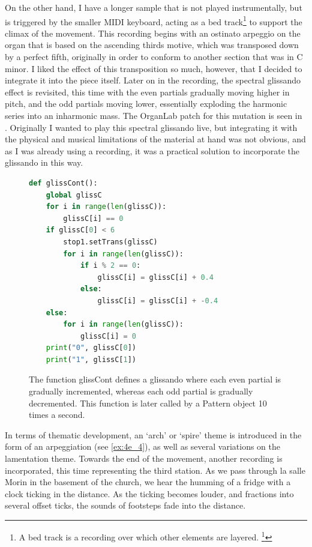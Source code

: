 \documentclass[12pt,twoside,maitrise]{dms_ks}
\theoremstyle{definition}
\begin{document}
{On the other hand, I have a longer sample that is not played instrumentally, but is triggered by the smaller MIDI keyboard, acting as a bed track\footnote{A bed track is a recording over which other elements are layered. \footcite{attariwala_re-imagining_2021}} to support the climax of the movement. 
This recording begins with an ostinato arpeggio on the organ that is based on the ascending thirds motive, which was transposed down by a perfect fifth, originally in order to conform to another section that was in C minor. 
I liked the effect of this transposition so much, however, that I decided to integrate it into the piece itself. 
Later on in the recording, the spectral glissando effect is revisited, this time with the even partials gradually moving higher in pitch, and the odd partials moving lower, essentially exploding the harmonic series into an inharmonic mass. 
The OrganLab patch for this mutation is seen in .
Originally I wanted to play this spectral glissando live, but integrating it with the physical and musical limitations of the material at hand was not obvious, and as I was already using a recording, it was a practical solution to incorporate the glissando in this way.

\begin{figure}[H]
\begin{lstlisting}[language=Python]
def glissCont():
    global glissC
    for i in range(len(glissC)):
        glissC[i] == 0
    if glissC[0] < 6
        stop1.setTrans(glissC)
        for i in range(len(glissC)):
            if i % 2 == 0:
                glissC[i] = glissC[i] + 0.4
            else:
                glissC[i] = glissC[i] + -0.4
    else:
        for i in range(len(glissC)):
            glissC[i] = 0
    print("0", glissC[0])
    print("1", glissC[1])
\end{lstlisting}
\caption{The function glissCont defines a glissando where each even partial is gradually incremented, whereas each odd partial is gradually decremented. This function is later called by a Pattern object 10 times a second.}
\label{fig:glisscont}
\end{figure}

In terms of thematic development, an `arch' or `spire' theme is introduced in the form of an arpeggiation (see \cref{ex:4e_4}), as well as several variations on the lamentation theme.
Towards the end of the movement, another recording is incorporated, this time representing the third station.
As we pass through la salle Morin in the basement of the church, we hear the humming of a fridge with a clock ticking in the distance. As the ticking becomes louder, and fractions into several offset ticks, the sounds of footsteps fade into the distance.

}
\end{document}
